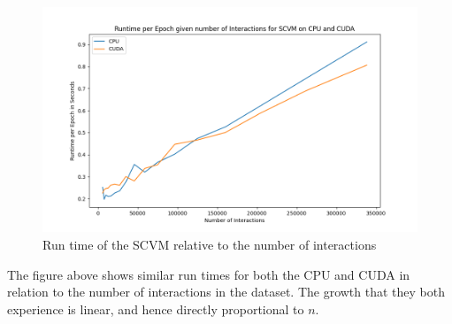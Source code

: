 \begin{figure}[H]
    \centering
    \includegraphics[width=\textwidth]{0_images/numinteractions_runtime2.png}
    \caption{Run time of the SCVM relative to the number of interactions}
    \label{fig:NumInteractionsRuntimes}
\end{figure}
The figure above shows similar run times for both the CPU and CUDA in relation to the number of interactions in the dataset.
The growth that they both experience is linear, and hence directly proportional to $n$.